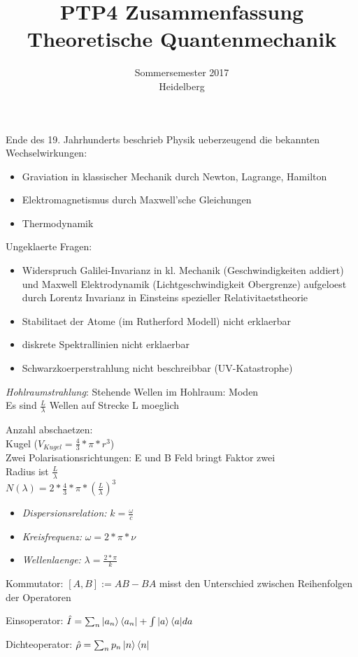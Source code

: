 \documentclass{article}
\begin{document}
\title{PTP4 Zusammenfassung \\ Theoretische Quantenmechanik}
\date{Sommersemester 2017\\Heidelberg}
\maketitle


Ende des 19. Jahrhunderts beschrieb Physik ueberzeugend die bekannten Wechselwirkungen:
\begin{itemize}
\item Graviation in klassischer Mechanik durch Newton, Lagrange, Hamilton
\item Elektromagnetismus durch Maxwell'sche Gleichungen
\item Thermodynamik
\end{itemize}

Ungeklaerte Fragen: 
\begin{itemize}
\item Widerspruch Galilei-Invarianz in kl. Mechanik (Geschwindigkeiten addiert) und Maxwell Elektrodynamik (Lichtgeschwindigkeit Obergrenze) aufgeloest durch Lorentz Invarianz in Einsteins spezieller Relativitaetstheorie
\item Stabilitaet der Atome (im Rutherford Modell) nicht erklaerbar
\item diskrete Spektrallinien nicht erklaerbar
\item Schwarzkoerperstrahlung nicht beschreibbar (UV-Katastrophe)
\end{itemize}

\emph{Hohlraumstrahlung}: 
Stehende Wellen im Hohlraum: Moden \\
Es sind $\frac{L}{\lambda}$ Wellen auf Strecke L moeglich


Anzahl abschaetzen: \\
Kugel ($V_{Kugel}=\frac{4}{3}*\pi*r^3$)\\
Zwei Polarisationsrichtungen: E und B Feld bringt Faktor zwei\\
Radius ist $\frac{L}{\lambda}$\\
$N(\lambda)  = 2*\frac{4}{3}*\pi*(\frac{L}{\lambda})^3$\\

\begin{itemize}
\item\emph{Dispersionsrelation:} $k = \frac{\omega}{c}$
\item\emph{Kreisfrequenz:} $\omega = 2*\pi*\nu$
\item\emph{Wellenlaenge:} $\lambda = \frac{2*\pi}{k}$
\end{itemize}

Kommutator: $[A, B] := AB - BA$ misst den Unterschied zwischen Reihenfolgen der Operatoren 

Einsoperator: $\hat{I}=\sum_n{\ket{a_n}\bra{a_n}} + \int{\ket{a}\bra{a}}da$

Dichteoperator: $\hat{\rho}=\sum_n{p_n \ket{n}\bra{n}}$
\end{document}
